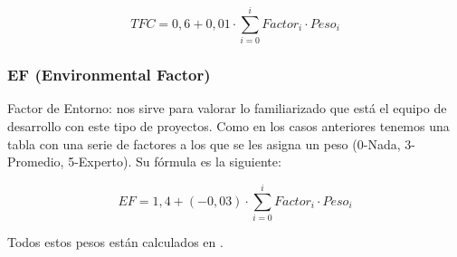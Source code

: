 \[ TFC = 0,6 + 0,01 \cdot \sum_{i = 0}^{i} Factor_{i} \cdot Peso_{i} \]

\subsubsection*{EF (Environmental Factor)}
Factor de Entorno: nos sirve para valorar lo familiarizado que está el equipo de desarrollo con este tipo de proyectos. Como en los casos anteriores tenemos una tabla con una serie de factores a los que se les asigna un peso (0-Nada, 3-Promedio, 5-Experto). Su fórmula es la siguiente:

 \[ EF = 1,4 + (-0,03) \cdot \sum_{i = 0}^{i} Factor_{i} \cdot Peso_{i} \]
 
Todos estos pesos están calculados en .


